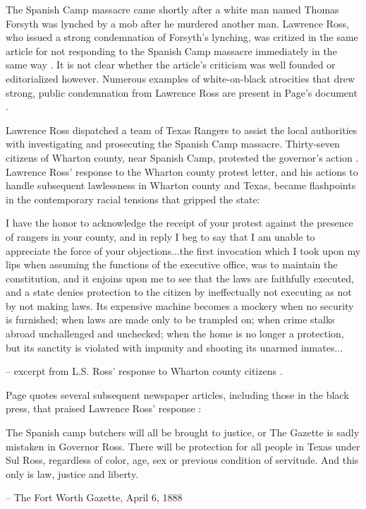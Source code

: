 \documentclass[12pt]{article}
\begin{document}
The Spanish Camp massacre came shortly after a white man named Thomas Forsyth was lynched by a mob after he murdered another man. Lawrence Ross, who issued a strong condemnation of Forsyth's lynching, was critized in the same article for not responding to the Spanish Camp massacre immediately in the same way \cite[pg. 97--98]{page}. It is not clear whether the article's criticism was well founded or editorialized however. Numerous examples of white-on-black atrocities that drew strong, public condemnation from Lawrence Ross are present in Page's document \cite[95--155, etc]{page}. 

Lawrence Ross dispatched a team of Texas Rangers to assist the local authorities with investigating and prosecuting the Spanish Camp massacre. Thirty-seven citizens of Wharton county, near Spanish Camp, protested the governor's action \cite[pg. 104--106]{page}. Lawrence Ross' response to the Wharton county protest letter, and his actions to handle subsequent lawlessness in Wharton county and Texas, became flashpoints in the contemporary racial tensions that gripped the state:
\begin{displayquote}
I have the honor to acknowledge the receipt of your protest against the presence of rangers in your county, and in reply I beg to say that I am unable to appreciate the force of your objections...the first invocation which I took upon my lips when assuming the functions of the executive office, was to maintain the constitution, and it enjoins upon me to see that the laws are faithfully executed, and a state denies protection to the citizen by ineffectually not executing as not by not making laws. Its expensive machine becomes a mockery when no security is furnished; when laws are made only to be trampled on; when crime stalks abroad unchallenged and unchecked; when the home is no longer a protection, but its sanctity is violated with impunity and shooting its unarmed inmates...

-- excerpt from L.S. Ross' response to Wharton county citizens \cite{gdaily:1888-03-21}.
\end{displayquote} 

Page quotes several subsequent newspaper articles, including those in the black press, that praised Lawrence Ross' response \cite[pg. 106--108]{page}:
\begin{displayquote}
The Spanish camp butchers will all be brought to justice, or The Gazette is sadly mistaken in Governor Ross. There will be protection for all people in Texas under Sul Ross, regardless of color, age, sex or previous condition of servitude. And this only is law, justice and liberty.

-- The Fort Worth Gazette, April 6, 1888 \cite{fwg:1888-04-06}
\end{displayquote}
\end{document}
